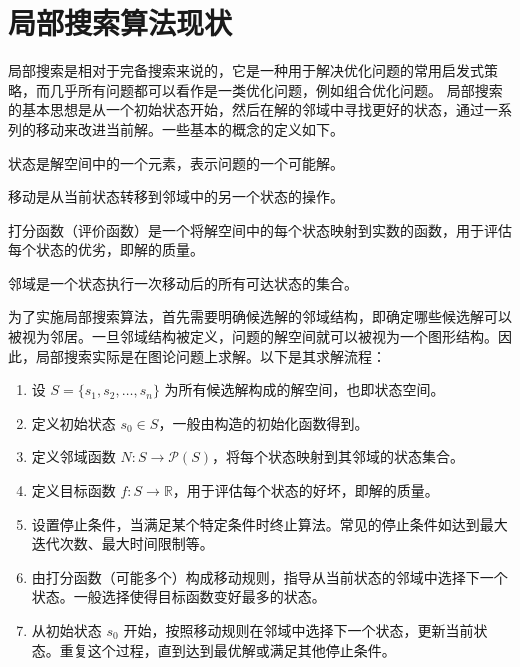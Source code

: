 \section{局部搜索算法现状}

局部搜索是相对于完备搜索来说的，它是一种用于解决优化问题的常用启发式策略，而几乎所有问题都可以看作是一类优化问题，例如组合优化问题。
局部搜索的基本思想是从一个初始状态开始，然后在解的邻域中寻找更好的状态，通过一系列的移动来改进当前解。一些基本的概念的定义如下。

\begin{definition}[\textbf{状态}] 状态是解空间中的一个元素，表示问题的一个可能解。\end{definition}

\begin{definition}[\textbf{移动}] 移动是从当前状态转移到邻域中的另一个状态的操作。 \end{definition}

\begin{definition} 打分函数（评价函数）是一个将解空间中的每个状态映射到实数的函数，用于评估每个状态的优劣，即解的质量。 \end{definition}

\begin{definition}[\textbf{邻域}] 邻域是一个状态执行一次移动后的所有可达状态的集合。\end{definition}


为了实施局部搜索算法，首先需要明确候选解的邻域结构，即确定哪些候选解可以被视为邻居。一旦邻域结构被定义，问题的解空间就可以被视为一个图形结构。因此，局部搜索实际是在图论问题上求解。以下是其求解流程：
\begin{enumerate}
    \item 设 $S = \{s_1, s_2, \ldots, s_n\}$ 为所有候选解构成的解空间，也即状态空间。
    \item 定义初始状态 $s_0 \in S$，一般由构造的初始化函数得到。
    \item 定义邻域函数 $N : S \rightarrow \mathcal{P}(S)$，将每个状态映射到其邻域的状态集合。
    \item 定义目标函数 $f : S \rightarrow \mathbb{R}$，用于评估每个状态的好坏，即解的质量。
    \item 设置停止条件，当满足某个特定条件时终止算法。常见的停止条件如达到最大迭代次数、最大时间限制等。
    \item 由打分函数（可能多个）构成移动规则，指导从当前状态的邻域中选择下一个状态。一般选择使得目标函数变好最多的状态。
    \item 从初始状态 $s_0$ 开始，按照移动规则在邻域中选择下一个状态，更新当前状态。重复这个过程，直到达到最优解或满足其他停止条件。
\end{enumerate}

